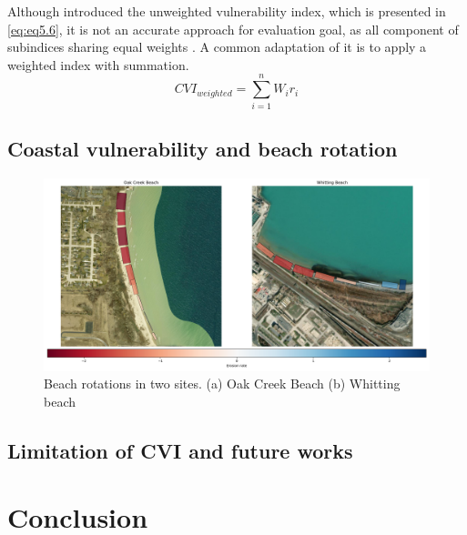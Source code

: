 Although \citet{gornitz_global_1991} introduced the unweighted vulnerability index,
which is presented in \ref{eq:eq5.6}, it is not an accurate approach for evaluation goal,
as all component of subindices sharing equal weights \citet{fu2022characteristics}. A common
adaptation of it is to apply a weighted index with summation.
\begin{equation}
  CVI_{weighted} = \sum_{i=1}^{n}W_ir_i
\label{eq:eq5.7}
\end{equation}




\subsection{Coastal vulnerability and beach rotation}
\label{rotation}

\begin{figure}[htbp]
  \centering
  \includegraphics[width=1\textwidth]{chapter5/resources/sites_rotation.png}
  \caption{Beach rotations in two sites. (a) Oak Creek Beach (b) Whitting beach}
  \label{fig:cites_rotations}
\end{figure}

\subsection{Limitation of CVI and future works}
\label{Limitation of CVI}

\section{Conclusion}
\label{c5_Conclusion}